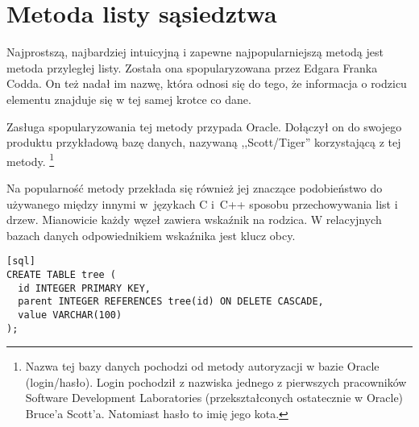 \section{Metoda listy sąsiedztwa}








Najprostszą, najbardziej intuicyjną i zapewne najpopularniejszą metodą jest metoda przyległej listy.
Została ona spopularyzowana przez Edgara Franka Codda. 
On też nadał im nazwę, która odnosi się do tego, że informacja o rodzicu elementu znajduje się w tej samej krotce co dane.

Zasługa spopularyzowania tej metody przypada Oracle. 
Dołączył on do swojego produktu przykładową bazę danych, nazywaną ,,Scott/Tiger'' 
korzystającą z tej metody.
\footnote{
    Nazwa tej bazy danych pochodzi od metody autoryzacji w bazie Oracle (login/hasło).
    Login pochodził z nazwiska jednego z pierwszych pracowników 
    Software Development Laboratories (przekształconych ostatecznie w Oracle) Bruce'a Scott'a. 
    Natomiast hasło to imię jego kota.
}

Na popularność metody przekłada się również jej znaczące podobieństwo do 
używanego między innymi w~językach C i~C++ sposobu przechowywania list i drzew.
Mianowicie każdy węzeł zawiera wskaźnik na rodzica. 
W relacyjnych bazach danych odpowiednikiem wskaźnika jest klucz obcy. 


\begin{verbatim}[sql]
CREATE TABLE tree (
  id INTEGER PRIMARY KEY,
  parent INTEGER REFERENCES tree(id) ON DELETE CASCADE,
  value VARCHAR(100)
);
\end{verbatim}


